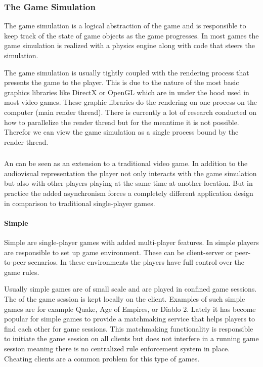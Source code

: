 \subsubsection{The Game Simulation}

The game simulation is a logical abstraction of the game and is responsible to
keep track of the state of game objects as the game progresses. In most games
the game simulation is realized with a physics engine along with code
that steers the simulation.

The game simulation is usually tightly coupled with the rendering process that
presents the game to the player. This is due to the nature of the most basic graphics
libraries like DirectX or OpenGL which are in under the hood used in most video
games. These graphic libraries do the rendering on one process on the computer
(main render thread). There is currently a lot of research conducted on how to
parallelize the render thread  but for the meantime it is
not possible. Therefor we can view the game simulation as a single process bound
by the render thread.

\subsubsection{\ogs{}}
An \og{} can be seen as an extension to a traditional video game. In addition to
the audiovisual representation the player not only interacts with the game
simulation but also with other players playing at the same time at another
location. But in practice the added asynchronism forces a completely different
application design in comparison to traditional single-player games.

\paragraph{Simple \ogs{}}

Simple \ogs{} are single-player games with added multi-player features.
In simple \ogs{} players are responsible to set up game environment. These can
be client-server or peer-to-peer scenarios. In these environments the players
have full control over the game rules.

Usually simple games are of small scale and are played in confined game
sessions. The of the game session is kept locally on the client. Examples of
such simple games are for example Quake, Age of Empires, or Diablo 2. Lately it
has become popular for simple games to provide a matchmaking service that helps
players to find each other for game sessions. This matchmaking functionality is
responsible to initiate the game session on all clients but does not interfere
in a running game session meaning there is no centralized rule enforcement
system in place. Cheating clients are a common problem for this type of games.

